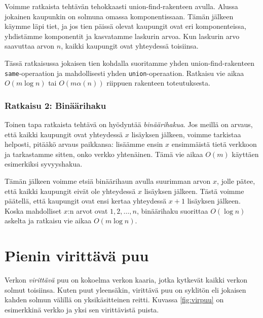 Voimme ratkaista tehtävän tehokkaasti union-find-rakenteen avulla.
Alussa jokainen kaupunkin on solmuna omassa komponentissaan.
Tämän jälkeen käymme läpi tiet, ja jos tien päissä olevat kaupungit
ovat eri komponenteissa, yhdistämme komponentit ja kasvatamme
laskurin arvoa. Kun laskurin arvo saavuttaa arvon $n$,
kaikki kaupungit ovat yhteydessä toisiinsa.

Tässä ratkaisussa jokaisen tien kohdalla suoritamme yhden
union-find-rakenteen \texttt{same}-operaation ja mahdollisesti
yhden \texttt{union}-operaation.
Ratkaisu vie aikaa $O(m \log n)$ tai $O(m \alpha(n))$
riippuen rakenteen toteutuksesta.

\subsubsection{Ratkaisu 2: Binäärihaku}

Toinen tapa ratkaista tehtävä on hyödyntää \emph{binäärihakua}.
Jos meillä on arvaus, että kaikki kaupungit ovat yhteydessä
$x$ lisäyksen jälkeen, voimme tarkistaa helposti,
pitääkö arvaus paikkansa:
lisäämme ensin $x$ ensimmäistä tietä verkkoon ja tarkastamme
sitten, onko verkko yhtenäinen. Tämä vie aikaa $O(m)$
käyttäen esimerkiksi syvyyshakua.

Tämän jälkeen voimme etsiä binäärihaun avulla suurimman arvon
$x$, jolle pätee, että kaikki kaupungit eivät ole yhteydessä
$x$ lisäyksen jälkeen. Tästä voimme päätellä, että kaupungit
ovat ensi kertaa yhteydessä $x+1$ lisäyksen jälkeen.
Koska mahdolliset $x$:n arvot ovat $1,2,\ldots,n$,
binäärihaku suorittaa $O(\log n)$ askelta ja ratkaisu vie
aikaa $O(m \log n)$.

\section{Pienin virittävä puu}

Verkon \emph{virittävä} puu on kokoelma verkon kaaria,
jotka kytkevät kaikki verkon solmut toisiinsa.
Kuten puut yleensäkin, virittävä puu on syklitön eli
jokaisen kahden solmun välillä on yksikäsitteinen reitti.
Kuvassa \ref{fig:virpuu} on esimerkkinä verkko ja yksi sen virittävistä puista.

